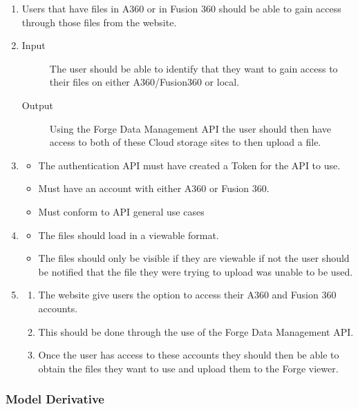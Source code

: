 \documentclass[letterpaper, 10pt, draftclsnofoot, compsoc, onecolumn]{IEEEtran}
\begin{document}
\begin{enumerate}
	\item Users that have files in A360 or in Fusion 360 should be able to gain access through those files from the
	website.

	\item
	\begin{description} 
		\item[Input] The user should be able to identify that they want to gain access to their files on either A360/Fusion360 or local. 
		\item[Output] Using the Forge Data Management API the user should then have access to both of these Cloud storage sites to then upload a file.
	\end{description}

	\item
	\begin{itemize}
		\item The authentication API must have created a Token for the API to use.
		\item Must have an account with either A360 or Fusion 360. 
		\item Must conform to API general use cases
	\end{itemize}

	\item
	\begin{itemize}
		\item The files should load in a viewable format.
		\item The files should only be visible if they are viewable if not the user should be notified that the file
			they were trying to upload was unable to be used.
	\end{itemize}
	
	\item 
	\begin{enumerate}
		\item The website give users the option to access their A360 and Fusion 360 accounts. 
		\item This should be done through the use of the Forge Data Management API. 
		\item Once the user has access to these accounts they should then be able to obtain the 
		files they want to use and upload them to the Forge viewer.
	\end{enumerate}
\end{enumerate}

\subsubsection{Model Derivative}
\end{document}
